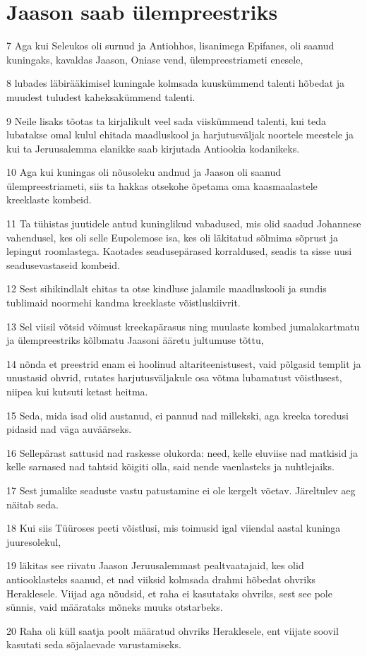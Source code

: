 \section*{Jaason saab ülempreestriks}

\par 7 Aga kui Seleukos oli surnud ja Antiohhos, lisanimega Epifanes, oli saanud kuningaks, kavaldas Jaason, Oniase vend, ülempreestriameti enesele,
\par 8 lubades läbirääkimisel kuningale kolmsada kuuskümmend talenti hõbedat ja muudest tuludest kaheksakümmend talenti.
\par 9 Neile lisaks tõotas ta kirjalikult veel sada viiskümmend talenti, kui teda lubatakse omal kulul ehitada maadluskool ja harjutusväljak noortele meestele ja kui ta Jeruusalemma elanikke saab kirjutada Antiookia kodanikeks.
\par 10 Aga kui kuningas oli nõusoleku andnud ja Jaason oli saanud ülempreestriameti, siis ta hakkas otsekohe õpetama oma kaasmaalastele kreeklaste kombeid.
\par 11 Ta tühistas juutidele antud kuninglikud vabadused, mis olid saadud Johannese vahendusel, kes oli selle Eupolemose isa, kes oli läkitatud sõlmima sõprust ja lepingut roomlastega. Kaotades seadusepärased korraldused, seadis ta sisse uusi seadusevastaseid kombeid.
\par 12 Sest sihikindlalt ehitas ta otse kindluse jalamile maadluskooli ja sundis tublimaid noormehi kandma kreeklaste võistluskiivrit.
\par 13 Sel viisil võtsid võimust kreekapärasus ning muulaste kombed jumalakartmatu ja ülempreestriks kõlbmatu Jaasoni ääretu jultumuse tõttu,
\par 14 nõnda et preestrid enam ei hoolinud altariteenistusest, vaid põlgasid templit ja unustasid ohvrid, rutates harjutusväljakule osa võtma lubamatust võistlusest, niipea kui kutsuti ketast heitma.
\par 15 Seda, mida isad olid austanud, ei pannud nad millekski, aga kreeka toredusi pidasid nad väga auväärseks.
\par 16 Sellepärast sattusid nad raskesse olukorda: need, kelle eluviise nad matkisid ja kelle sarnased nad tahtsid kõigiti olla, said nende vaenlasteks ja nuhtlejaiks.
\par 17 Sest jumalike seaduste vastu patustamine ei ole kergelt võetav. Järeltulev aeg näitab seda.
\par 18 Kui siis Tüüroses peeti võistlusi, mis toimusid igal viiendal aastal kuninga juuresolekul,
\par 19 läkitas see riivatu Jaason Jeruusalemmast pealtvaatajaid, kes olid antiooklasteks saanud, et nad viiksid kolmsada drahmi hõbedat ohvriks Heraklesele. Viijad aga nõudsid, et raha ei kasutataks ohvriks, sest see pole sünnis, vaid määrataks mõneks muuks otstarbeks.
\par 20 Raha oli küll saatja poolt määratud ohvriks Heraklesele, ent viijate soovil kasutati seda sõjalaevade varustamiseks.


